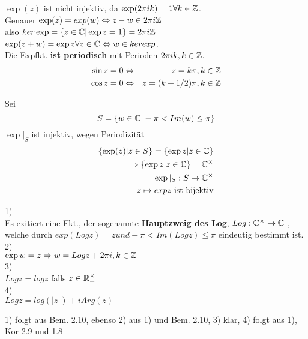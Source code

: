 \begin{bemerkung}
$\exp(z)$ ist nicht injektiv, da $\exp(2\pi i k ) = 1 \forall k \in \mathbb{Z}$.\\
Genauer $ \exp(z) = exp(w) \Leftrightarrow z-w \in 2\pi i \mathbb{Z}$ \\
also $ker \exp = \{z \in \mathbb{C}| \exp z = 1\} = 2\pi i \mathbb{Z}$
$\exp( z+w) = \exp z \forall z \in \mathbb{C} \Leftrightarrow w \in ker exp$.\\
Die Expfkt. \textbf{ist periodisch} mit Perioden $2 \pi i k, k \in \mathbb{Z}$.\\
\begin{eqnarray*}
\sin z = 0 &\Leftrightarrow & z = k\pi, k \in \mathbb{Z} \\
\cos z = 0 &\Leftrightarrow & z = (k+ 1/2)\pi, k \in \mathbb{Z}
\end{eqnarray*}
\end{bemerkung}

Sei
\[ 
S = \{ w \in \mathbb{C}| -\pi < Im(w) \leq \pi\}
\]
$\exp|_S$ ist injektiv, wegen Periodizität
\begin{eqnarray*}
\{\exp(z)| z \in S\} = \{ \exp z | z \in \mathbb{C}\}\\
\Rightarrow \{ \exp z | z \in \mathbb{C} \} = \mathbb{C}^{\times}\\
\exp|_S: S \to \mathbb{C}^{\times}\\
z \mapsto exp z \text{ ist bijektiv}
\end{eqnarray*}

\begin{definition}
\end{definition}
\begin{satz}
1)\\
Es exitiert eine Fkt., der sogenannte \textbf{Hauptzweig des Log}, $ Log: \mathbb{C}^{\times} \to \mathbb{C}$ , welche durch $ exp(Log z) = z und -\pi< Im(Log z) \leq \pi$ eindeutig bestimmt ist.\\
2)\\
$\exp w = z \Rightarrow w = Log z + 2 \pi i , k \in \mathbb{Z}$\\
3)\\
$Log z = log z$ falls $ z \in \mathbb{R}^{\times}_+$\\
4)\\
$Log z = log(|z|) + i Arg(z)$\\
\end{satz}
\begin{bew}
1) folgt aus Bem. 2.10, ebenso 2) aus 1) und Bem. 2.10, 3) klar, 4) folgt aus 1), Kor 2.9 und 1.8
\end{bew}